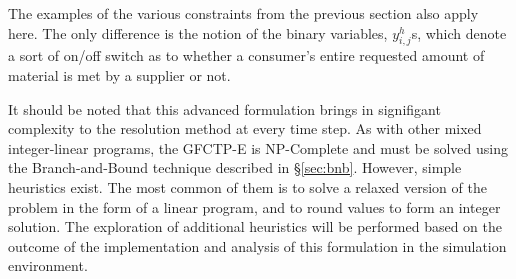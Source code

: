 The examples of the various constraints from the previous section also apply
here. The only difference is the notion of the binary variables, $y_{i,j}^{h}$s,
which denote a sort of on/off switch as to whether a consumer's entire requested
amount of material is met by a supplier or not.

It should be noted that this advanced formulation brings in signifigant
complexity to the resolution method at every time step. As with other mixed
integer-linear programs, the GFCTP-E is NP-Complete and must be solved using the
Branch-and-Bound technique described in \S\ref{sec:bnb}. However, simple
heuristics exist. The most common of them is to solve a relaxed version of the
problem in the form of a linear program, and to round values to form an integer
solution. The exploration of additional heuristics will be performed based on
the outcome of the implementation and analysis of this formulation in
the \Cyclus simulation environment.
